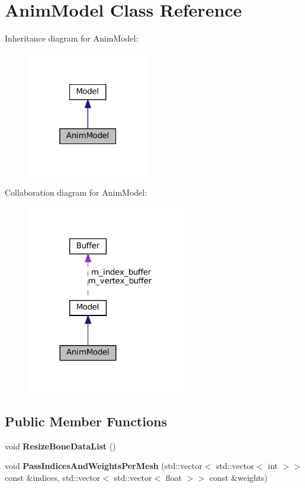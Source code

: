 \hypertarget{classAnimModel}{}\section{Anim\+Model Class Reference}
\label{classAnimModel}


Inheritance diagram for Anim\+Model\+:\nopagebreak
\begin{figure}[H]
\begin{center}
\leavevmode
\includegraphics[width=151pt]{classAnimModel__inherit__graph}
\end{center}
\end{figure}


Collaboration diagram for Anim\+Model\+:\nopagebreak
\begin{figure}[H]
\begin{center}
\leavevmode
\includegraphics[width=197pt]{classAnimModel__coll__graph}
\end{center}
\end{figure}
\subsection*{Public Member Functions}
\begin{DoxyCompactItemize}
\item 
\mbox{\label{classAnimModel_a7d7da460f196334227d35a273069699f}} 
void {\bfseries Resize\+Bone\+Data\+List} ()
\item 
\mbox{\label{classAnimModel_a13cb24e2748e157a5a7365b3c4ec103a}} 
void {\bfseries Pass\+Indices\+And\+Weights\+Per\+Mesh} (std\+::vector$<$ std\+::vector$<$ int $>$$>$ const \&indices, std\+::vector$<$ std\+::vector$<$ float $>$$>$ const \&weights)
\end{DoxyCompactItemize}

